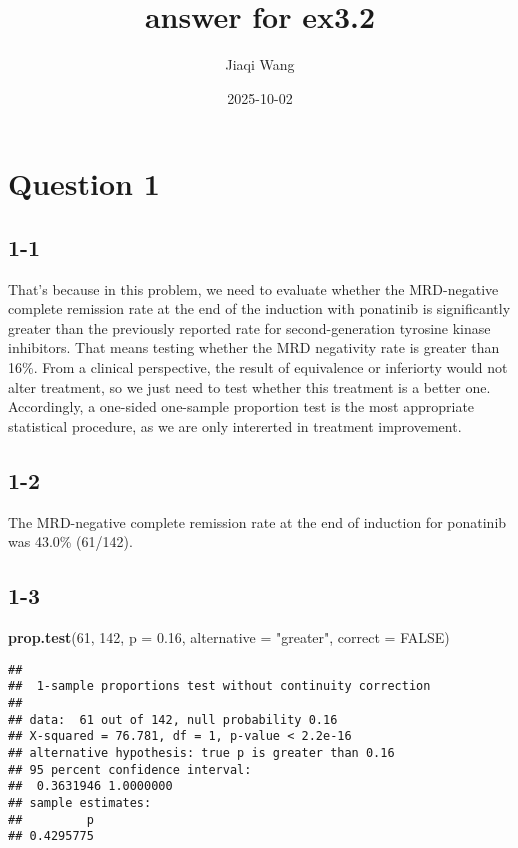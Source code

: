 \documentclass[
]{article}
\title{answer for ex3.2}
\author{Jiaqi Wang}
\date{2025-10-02}
\newenvironment{Shaded}{\begin{snugshade}}{\end{snugshade}}
\newcommand{\AttributeTok}[1]{\textcolor[rgb]{0.13,0.29,0.53}{#1}}
\newcommand{\ConstantTok}[1]{\textcolor[rgb]{0.56,0.35,0.01}{#1}}
\newcommand{\DecValTok}[1]{\textcolor[rgb]{0.00,0.00,0.81}{#1}}
\newcommand{\FloatTok}[1]{\textcolor[rgb]{0.00,0.00,0.81}{#1}}
\newcommand{\FunctionTok}[1]{\textcolor[rgb]{0.13,0.29,0.53}{\textbf{#1}}}
\newcommand{\NormalTok}[1]{#1}
\newcommand{\StringTok}[1]{\textcolor[rgb]{0.31,0.60,0.02}{#1}}
\begin{document}
\maketitle

\section{Question 1}\label{question-1}

\subsection{1-1}\label{section}

That's because in this problem, we need to evaluate whether the
MRD-negative complete remission rate at the end of the induction with
ponatinib is significantly greater than the previously reported rate for
second-generation tyrosine kinase inhibitors. That means testing whether
the MRD negativity rate is greater than 16\%. From a clinical
perspective, the result of equivalence or inferiorty would not alter
treatment, so we just need to test whether this treatment is a better
one. Accordingly, a one-sided one-sample proportion test is the most
appropriate statistical procedure, as we are only intererted in
treatment improvement.

\subsection{1-2}\label{section-1}

The MRD-negative complete remission rate at the end of induction for
ponatinib was 43.0\% (61/142).

\subsection{1-3}\label{section-2}

\begin{Shaded}
\begin{Highlighting}[]
\FunctionTok{prop.test}\NormalTok{(}\DecValTok{61}\NormalTok{, }\DecValTok{142}\NormalTok{, }
          \AttributeTok{p =} \FloatTok{0.16}\NormalTok{, }
          \AttributeTok{alternative =} \StringTok{"greater"}\NormalTok{, }
          \AttributeTok{correct =} \ConstantTok{FALSE}\NormalTok{)}
\end{Highlighting}
\end{Shaded}

\begin{verbatim}
## 
##  1-sample proportions test without continuity correction
## 
## data:  61 out of 142, null probability 0.16
## X-squared = 76.781, df = 1, p-value < 2.2e-16
## alternative hypothesis: true p is greater than 0.16
## 95 percent confidence interval:
##  0.3631946 1.0000000
## sample estimates:
##         p 
## 0.4295775
\end{verbatim}
\end{document}
